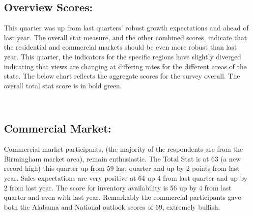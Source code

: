 \documentclass[11pt]{article}
\begin{document}
    \subsection{Overview Scores:}\label{overview-scores}
This quarter was up from last quarters' robust growth expectations and ahead of last year. The overall stat measure, and the other combined scores, indicate that the residential and commercial markets should be even more robust than last year. This quarter, the indicators for the specific regions have slightly diverged  indicating that views are changing at differing rates for the different areas of the state.   \newline
 \newline
    The below chart reflects the aggregate scores for the survey overall.
The overall total stat score is in bold green.


    \begin{center}
    \end{center}
    { \hspace*{\fill} \\}
    
    \subsection{Commercial Market:}\label{commercial-market}

    Commercial market participants, (the majority of the respondents are
from the Birmingham market area), remain enthusiastic. The Total Stat is
at 63 (a new record high) this quarter up from 59 last quarter and up by
2 points from last year. Sales expectations are very positive at 64 up 4
from last quarter and up by 2 from last year. The score for inventory
availability is 56 up by 4 from last quarter and even with last year.
Remarkably the commercial participants gave both the Alabama and
National outlook scores of 69, extremely bullish.


    \begin{center}
    \end{center}
    { \hspace*{\fill} \\}
    
\end{document}
